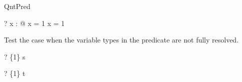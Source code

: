 \begin{zsection}
  \SECTION QntPred
\end{zsection}

\begin{zed}
  \vdash? \exists x : \nat @ x = 1 \lor x = 1
\end{zed}

Test the case when the variable types in the predicate are not fully 
resolved.
\begin{zed} \vdash? \{1\} \in s \end{zed}
\begin{zed} \vdash? \{1\} \in t \end{zed}

